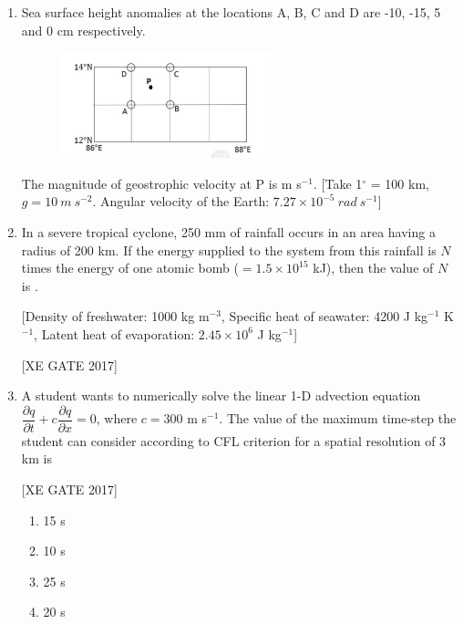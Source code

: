 \documentclass[journal,12pt,onecolumn]{IEEEtran}
\theoremstyle{remark}
\begin{document}
\begin{enumerate}
    (Angular velocity of the Earth: $7.27 \times 10^{-5}$ rad s$^{-1}$)  
    
    \hfill [XE GATE 2017]

\item Sea surface height anomalies at the locations A, B, C and D are -10, -15, 5 and 0 cm respectively.
\begin{figure}[H]
    \centering
    \includegraphics[width=0.5\linewidth]{figs/fig37.png}
    \caption{}
    \label{fig:placeholder}
\end{figure}
The magnitude of geostrophic velocity at P is \underline{\hspace{2cm}} m s$^{-1}$.
[Take 1$^\circ$ = 100 km, $g=10~m~s^{-2}$. Angular velocity of the Earth: $7.27 \times 10^{-5}~rad~s^{-1}$]

\item In a severe tropical cyclone, 250 mm of rainfall occurs in an area having a radius of 200 km. If the energy supplied to the system from this rainfall is $N$ times the energy of one atomic bomb ($=1.5\times10^{15}$ kJ), then the value of $N$ is \underline{\hspace{2cm}}.

[Density of freshwater: 1000 kg m$^{-3}$, Specific heat of seawater: 4200 J kg$^{-1}$ K$^{-1}$, Latent heat of evaporation: $2.45\times10^{6}$ J kg$^{-1}$]

\hfill [XE GATE 2017]


\item A student wants to numerically solve the linear 1-D advection equation $\dfrac{\partial q}{\partial t}+c\dfrac{\partial q}{\partial x}=0$, where $c=300$ m s$^{-1}$. The value of the maximum time-step the student can consider according to CFL criterion for a spatial resolution of 3 km is

\hfill [XE GATE 2017]

\begin{multicols}{2}
\begin{enumerate}
\item 15 s
\item 10 s
\item 25 s
\item 20 s
\end{enumerate}
\end{multicols}



\end{enumerate}
\end{document}
